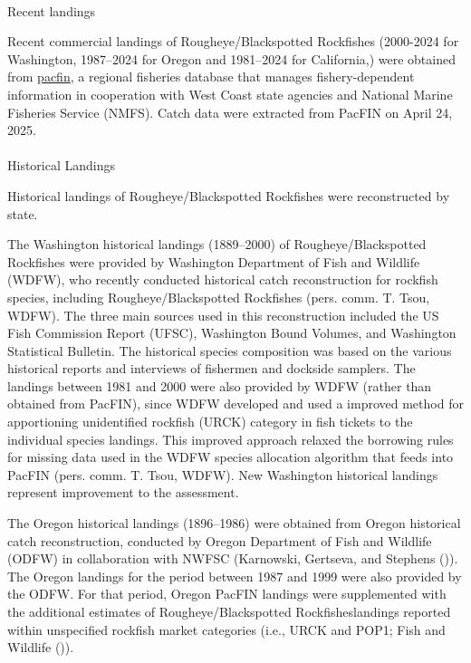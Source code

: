 \documentclass[
]{scrartcl}
\makeatletter
\let\oldparagraph\paragraph
\renewcommand{\paragraph}{
    \@ifstar
      \xxxParagraphStar
      \xxxParagraphNoStar
  }
\newcommand{\xxxParagraphStar}[1]{\oldparagraph*{#1}\mbox{}}
\newcommand{\xxxParagraphNoStar}[1]{\oldparagraph{#1}\mbox{}}
\makeatother
\begin{document}
\paragraph{Recent landings}\label{recent-landings}

Recent commercial landings of Rougheye/Blackspotted Rockfishes
(2000-2024 for Washington, 1987--2024 for Oregon and 1981--2024 for
California,) were obtained from
\href{www.pacfin.psmfc.org}{\gls{pacfin}}, a regional fisheries database
that manages fishery-dependent information in cooperation with West
Coast state agencies and National Marine Fisheries Service (NMFS). Catch
data were extracted from PacFIN on April 24, 2025.

\paragraph{Historical Landings}\label{historical-landings}

Historical landings of Rougheye/Blackspotted Rockfishes were
reconstructed by state.

The Washington historical landings (1889--2000) of Rougheye/Blackspotted
Rockfishes were provided by Washington Department of Fish and Wildlife
(WDFW), who recently conducted historical catch reconstruction for
rockfish species, including Rougheye/Blackspotted Rockfishes (pers.
comm. T. Tsou, WDFW). The three main sources used in this reconstruction
included the US Fish Commission Report (UFSC), Washington Bound Volumes,
and Washington Statistical Bulletin. The historical species composition
was based on the various historical reports and interviews of fishermen
and dockside samplers. The landings between 1981 and 2000 were also
provided by WDFW (rather than obtained from PacFIN), since WDFW
developed and used a improved method for apportioning unidentified
rockfish (URCK) category in fish tickets to the individual species
landings. This improved approach relaxed the borrowing rules for missing
data used in the WDFW species allocation algorithm that feeds into
PacFIN (pers. comm. T. Tsou, WDFW). New Washington historical landings
represent improvement to the assessment.

The Oregon historical landings (1896--1986) were obtained from Oregon
historical catch reconstruction, conducted by Oregon Department of Fish
and Wildlife (ODFW) in collaboration with NWFSC (Karnowski, Gertseva,
and Stephens ()). The
Oregon landings for the period between 1987 and 1999 were also provided
by the ODFW. For that period, Oregon PacFIN landings were supplemented
with the additional estimates of Rougheye/Blackspotted
Rockfisheslandings reported within unspecified rockfish market
categories (i.e., URCK and POP1; Fish and Wildlife
()).
\end{document}

